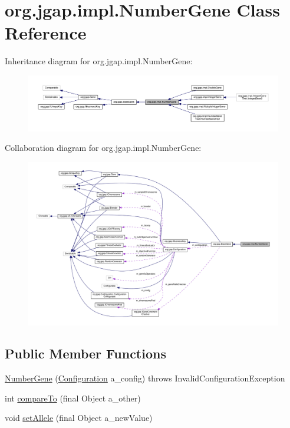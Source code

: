 \hypertarget{classorg_1_1jgap_1_1impl_1_1_number_gene}{\section{org.\-jgap.\-impl.\-Number\-Gene Class Reference}
\label{classorg_1_1jgap_1_1impl_1_1_number_gene}
}


Inheritance diagram for org.\-jgap.\-impl.\-Number\-Gene\-:
\nopagebreak
\begin{figure}[H]
\begin{center}
\leavevmode
\includegraphics[width=350pt]{classorg_1_1jgap_1_1impl_1_1_number_gene__inherit__graph}
\end{center}
\end{figure}


Collaboration diagram for org.\-jgap.\-impl.\-Number\-Gene\-:
\nopagebreak
\begin{figure}[H]
\begin{center}
\leavevmode
\includegraphics[width=350pt]{classorg_1_1jgap_1_1impl_1_1_number_gene__coll__graph}
\end{center}
\end{figure}
\subsection*{Public Member Functions}
\begin{DoxyCompactItemize}
\item 
\hyperlink{classorg_1_1jgap_1_1impl_1_1_number_gene_a5d2265fad09b1e672f56fc1279c9262b}{Number\-Gene} (\hyperlink{classorg_1_1jgap_1_1_configuration}{Configuration} a\-\_\-config)  throws Invalid\-Configuration\-Exception 
\item 
int \hyperlink{classorg_1_1jgap_1_1impl_1_1_number_gene_a3d3b44370a460ad1467f4dd0520a2f95}{compare\-To} (final Object a\-\_\-other)
\item 
void \hyperlink{classorg_1_1jgap_1_1impl_1_1_number_gene_a694c7472b269b500d40eca6966e21291}{set\-Allele} (final Object a\-\_\-new\-Value)
\end{DoxyCompactItemize}
